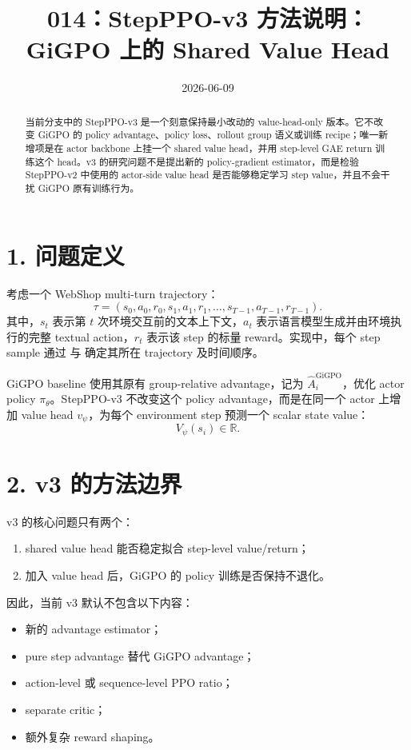 \documentclass[10pt]{ctexart}
\title{014：StepPPO-v3 方法说明：GiGPO 上的 Shared Value Head}
\author{}
\date{2026-06-09}
\begin{document}
\maketitle
\vspace{-1.2em}
\sloppy

\begin{abstract}
当前分支中的 StepPPO-v3 是一个刻意保持最小改动的 value-head-only 版本。它不改变 GiGPO 的 policy advantage、policy loss、rollout group 语义或训练 recipe；唯一新增项是在 actor backbone 上挂一个 shared value head，并用 step-level GAE return 训练这个 head。v3 的研究问题不是提出新的 policy-gradient estimator，而是检验 StepPPO-v2 中使用的 actor-side value head 是否能够稳定学习 step value，并且不会干扰 GiGPO 原有训练行为。
\end{abstract}

\section*{1. 问题定义}
考虑一个 WebShop multi-turn trajectory：
\[
\tau = (s_0, a_0, r_0, s_1, a_1, r_1, \ldots, s_{T-1}, a_{T-1}, r_{T-1}).
\]
其中，\(s_t\) 表示第 \(t\) 次环境交互前的文本上下文，\(a_t\) 表示语言模型生成并由环境执行的完整 textual action，\(r_t\) 表示该 step 的标量 reward。实现中，每个 step sample 通过  与  确定其所在 trajectory 及时间顺序。

GiGPO baseline 使用其原有 group-relative advantage，记为 \(\widehat A_i^{\mathrm{GiGPO}}\)，优化 actor policy \(\pi_\theta\)。StepPPO-v3 不改变这个 policy advantage，而是在同一个 actor 上增加 value head \(v_\psi\)，为每个 environment step 预测一个 scalar state value：
\[
V_\psi(s_i) \in \mathbb{R}.
\]

\section*{2. v3 的方法边界}
v3 的核心问题只有两个：
\begin{enumerate}
  \item shared value head 能否稳定拟合 step-level value/return；
  \item 加入 value head 后，GiGPO 的 policy 训练是否保持不退化。
\end{enumerate}

因此，当前 v3 默认不包含以下内容：
\begin{itemize}
  \item 新的  advantage estimator；
  \item pure step advantage 替代 GiGPO advantage；
  \item action-level 或 sequence-level PPO ratio；
  \item separate critic；
  \item 额外复杂 reward shaping。
\end{itemize}
\end{document}
